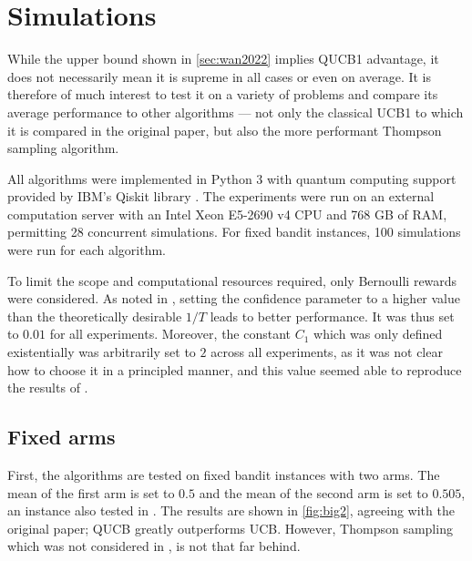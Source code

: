 \chapter{Simulations}
\label{sec:simulations}

While the upper bound shown in \cref{sec:wan2022} implies QUCB1 advantage, it does not necessarily mean it is supreme in all cases or even on average.
It is therefore of much interest to test it on a variety of problems and compare its average performance to other algorithms — not only the classical UCB1 to which it is compared in the original paper, but also the more performant Thompson sampling algorithm.

All algorithms were implemented in Python 3 \autocite{python} with quantum computing support provided by IBM's Qiskit library \autocite{qiskit}.
The experiments were run on an external computation server with an Intel Xeon E5-2690 v4 CPU and 768 GB of RAM, permitting 28 concurrent simulations.
For fixed bandit instances, 100 simulations were run for each algorithm.

To limit the scope and computational resources required, only Bernoulli rewards were considered.
As noted in \autocite{wan2022}, setting the confidence parameter to a higher value than the theoretically desirable $1/T$ leads to better performance.
It was thus set to $0.01$ for all experiments.
Moreover, the constant $C_1$ which was only defined existentially was arbitrarily set to $2$ across all experiments, as it was not clear how to choose it in a principled manner, and this value seemed able to reproduce the results of \autocite{wan2022}.

\section{Fixed arms}
First, the algorithms are tested on fixed bandit instances with two arms.
The mean of the first arm is set to $0.5$ and the mean of the second arm is set to $0.505$, an instance also tested in \autocite{wan2022}.
The results are shown in \cref{fig:big2}, agreeing with the original paper; QUCB greatly outperforms UCB.
However, Thompson sampling which was not considered in \autocite{wan2022}, is not that far behind.


